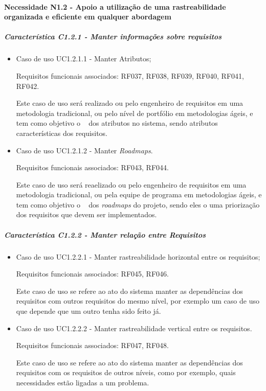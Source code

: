 \paragraph{Necessidade N1.2 - Apoio a utilização de uma rastreabilidade organizada e eficiente em qualquer abordagem}
	\subparagraph{Característica C1.2.1 - Manter informações sobre requisitos}
		\begin{itemize}
			
			\item Caso de uso UC1.2.1.1 - Manter Atributos;
			
			Requisitos funcionais associados: RF037, RF038, RF039, RF040, RF041, RF042.

			Este caso de uso será realizado ou pelo engenheiro de requisitos em uma metodologia tradicional, ou pelo nível de portfólio em metodologias ágeis, e tem como objetivo o \CRUD~ dos atributos no sistema, sendo atributos características dos requisitos.
		
			\item Caso de uso UC1.2.1.2 - Manter \textit{Roadmaps}.
			
			Requisitos funcionais associados: RF043, RF044.
			
			Este caso de uso será reaelizado ou pelo engenheiro de requisitos em uma metodologia tradicional, ou pela equipe de programa em metodologias ágeis, e tem como objetivo o \CRUD~ dos \textit{roadmaps} do projeto, sendo eles o uma priorização dos requisitos que devem ser implementados.

		\end{itemize}

	\subparagraph{Característica C1.2.2 - Manter relação entre Requisitos}
		\begin{itemize}
			
			\item Caso de uso UC1.2.2.1 - Manter rastreabilidade horizontal entre os requisitos;
					
					Requisitos funcionais associados: RF045, RF046.

					Este caso de uso se refere ao ato do sistema manter as dependências dos requisitos com outros requisitos do mesmo nível, por exemplo um caso de uso que depende que um outro tenha sido feito já.
				
			
			\item Caso de uso UC1.2.2.2 - Manter rastreabilidade vertical entre os requisitos.
					
					Requisitos funcionais associados: RF047, RF048.

					Este caso de uso se refere ao ato do sistema manter as dependências dos requisitos com os requisitos de outros níveis, como por exemplo, quais necessidades estão ligadas a um problema.
		\end{itemize}

